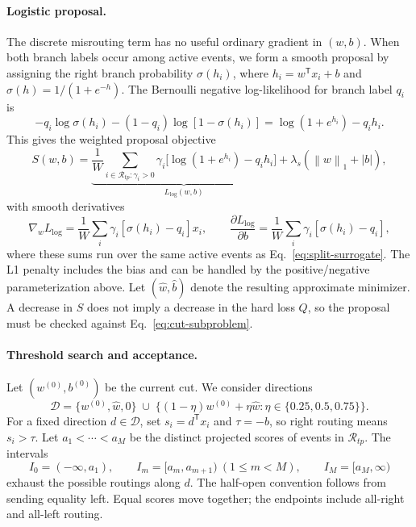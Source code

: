\documentclass[11pt,a4paper]{article}
\newcommand{\normone}[1]{\left\lVert #1\right\rVert_1}
\begin{document}
\paragraph{Logistic proposal.}
The discrete misrouting term has no useful ordinary gradient in $(w,b)$.
When both branch labels occur among active events, we form a smooth proposal
by assigning the right branch probability
$\sigma(h_i)$, where $h_i=w^{\mathsf T}x_i+b$ and
$\sigma(h)=1/(1+e^{-h})$. The Bernoulli negative log-likelihood for branch
label $q_i$ is
\begin{equation}
 -q_i\log\sigma(h_i)-(1-q_i)\log[1-\sigma(h_i)]
 =\log(1+e^{h_i})-q_i h_i.
 \label{eq:branch-logistic-loss}
\end{equation}
This gives the weighted proposal objective
\begin{equation}
 S(w,b)=\underbrace{\frac1W\sum_{i\in\mathcal R_{tp}:\gamma_i>0}
 \gamma_i\big[\log(1+e^{h_i})-q_i h_i\big]}_{L_{\mathrm{log}}(w,b)}
 +\lambda_s(\normone{w}+|b|),
 \label{eq:split-surrogate}
\end{equation}
with smooth derivatives
\begin{equation}
 \nabla_w L_{\mathrm{log}}=\frac1W\sum_i\gamma_i[\sigma(h_i)-q_i]x_i,
 \qquad
 \frac{\partial L_{\mathrm{log}}}{\partial b}
 =\frac1W\sum_i\gamma_i[\sigma(h_i)-q_i],
 \label{eq:split-surrogate-gradient}
\end{equation}
where these sums run over the same active events as
Eq.~\eqref{eq:split-surrogate}. The L1 penalty includes the bias and can be
handled by the positive/negative parameterization above. Let
$(\widehat w,\widehat b)$ denote the resulting approximate minimizer. A decrease
in $S$ does not imply a decrease in the hard loss $Q$, so the proposal must be
checked against Eq.~\eqref{eq:cut-subproblem}.

\paragraph{Threshold search and acceptance.}
Let $(w^{(0)},b^{(0)})$ be the current cut. We consider directions
\begin{equation}
 \mathcal D=\{w^{(0)},\widehat w,0\}
 \;\cup\;
 \{(1-\eta)w^{(0)}+\eta\widehat w:
                 \eta\in\{0.25,0.5,0.75\}\}.
 \label{eq:cut-directions}
\end{equation}
For a fixed direction $d\in\mathcal D$, set $s_i=d^{\mathsf T}x_i$ and
$\tau=-b$, so right routing means $s_i>\tau$. Let
$a_1<\cdots<a_M$ be the distinct projected scores of events in
$\mathcal R_{tp}$. The intervals
\begin{equation}
 I_0=(-\infty,a_1),\qquad I_m=[a_m,a_{m+1})\ (1\leq m<M),\qquad
 I_M=[a_M,\infty)
 \label{eq:threshold-intervals}
\end{equation}
exhaust the possible routings along $d$. The half-open convention follows
from sending equality left. Equal scores move together; the endpoints
include all-right and all-left routing.
\end{document}
